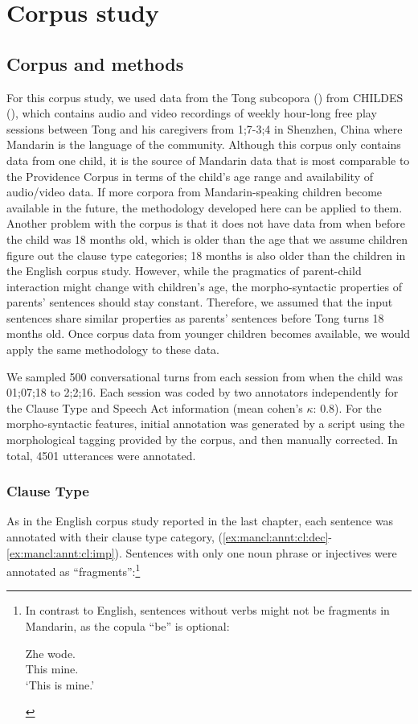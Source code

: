 \section{Corpus study}
\label{sec:mancl:corpus}

\subsection{Corpus and methods}
\label{sec:mancl:corpus:method}
For this corpus study, we used data from the Tong subcopora (\cite{TongCorpus}) from CHILDES (\cite{CHILDES}), which contains audio and video recordings of weekly hour-long free play sessions between Tong and his caregivers from 1;7-3;4 in Shenzhen, China where Mandarin is the language of the community. Although this corpus only contains data from one child, it is the source of Mandarin data that is most comparable to the Providence Corpus in terms of the child's age range and availability of audio/video data. If more corpora from Mandarin-speaking children become available in the future, the methodology developed here can be applied to them. Another problem with the corpus is that it does not have data from when before the child was 18 months old, which is older than the age that we assume children figure out the clause type categories; 18 months is also older than the children in the English corpus study. However, while the pragmatics of parent-child interaction might change with children's age, the morpho-syntactic properties of parents' sentences should stay constant. Therefore, we assumed that the input sentences share similar properties as parents' sentences before Tong turns 18 months old. Once corpus data from younger children becomes available, we would apply the same methodology to these data. 

We sampled 500 conversational turns from each session from when the child was 01;07;18 to 2;2;16. Each session was coded by two annotators independently for the Clause Type and Speech Act information (mean cohen's $\kappa$: 0.8). For the morpho-syntactic features, initial annotation was generated by a script using the morphological tagging provided by the corpus, and then manually corrected. In total, 4501 utterances were annotated. 

\subsubsection{Clause Type}

As in the English corpus study reported in the last chapter, each sentence was annotated with their clause type category, \diis{} (\ref{ex:mancl:annt:cl:dec}-\ref{ex:mancl:annt:cl:imp}). Sentences with only one noun phrase or injectives were annotated as ``fragments'':\footnote{In contrast to English, sentences without verbs might not be fragments in Mandarin, as the copula  ``be'' is optional:
\begin{xlist}
\ex 
\gll Zhe wode.\\
This mine.\\
\trans `This is mine.'
\end{xlist}
}

